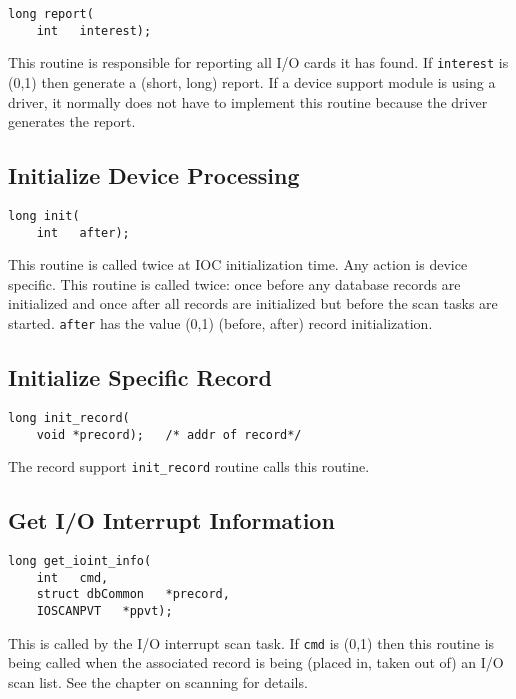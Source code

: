 \begin{verbatim}long report(
    int   interest);
\end{verbatim}This routine is responsible for reporting all I/O cards it has found. If \verb|interest| is (0,1) then generate a (short, long) 
report. If a device support module is using a driver, it normally does not have to implement this routine because the driver 
generates the report.

\subsection{Initialize Device Processing}

\begin{verbatim}
long init(
    int   after);
\end{verbatim}This routine is called twice at IOC initialization time. Any action is device specific. This routine is called twice: once 
before any database records are initialized and once after all records are initialized but before the scan tasks are started. 
\verb|after| has the value (0,1) (before, after) record initialization.

\subsection{Initialize Specific Record}

\begin{verbatim}
long init_record(
    void *precord);   /* addr of record*/
\end{verbatim}The record support \verb|init_record| routine calls this routine.

\subsection{Get I/O Interrupt Information}

\begin{verbatim}
long get_ioint_info(
    int   cmd,
    struct dbCommon   *precord,
    IOSCANPVT   *ppvt);
\end{verbatim}This is called by the I/O interrupt scan task. If \verb|cmd| is (0,1) then this routine is being called when the associated record is 
being (placed in, taken out of) an I/O scan list. See the chapter on scanning for details.

